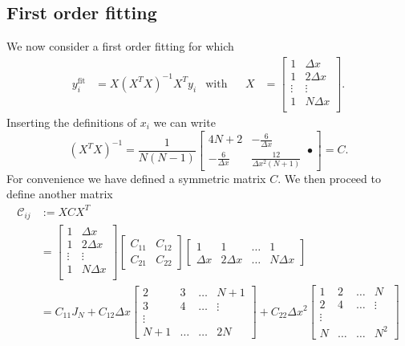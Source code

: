 \subsection{First order fitting}
We now consider a first order fitting for which
\begin{align}
y^{\textrm{fit}}_{i} & = X\left(X^{T}X\right)^{-1} X^{T} y_{i} & \textrm{with} &&
X & = \left[\begin{array}{cc}
1 & \Delta x \\
1 & 2 \Delta x  \\
\vdots & \vdots  \\
1 & N \Delta x  \\
\end{array}\right].
\end{align}
Inserting the definitions of $x_{i}$ we can write
\begin{equation}
\left(X^{T}X\right)^{-1} = \frac{1}{N(N-1)}\left[
\begin{array}{cc}
4N+2 & -\frac{6}{\Delta x} \\
 -\frac{6}{\Delta x} & \frac{12}{\Delta x^{2} (N+1)}
\end{array}•
\right] = C.
\end{equation}
For convenience we have defined a symmetric matrix $C$. We then proceed to
define another matrix
\begin{align}
    \mathcal{C}_{ij} & := XCX^{T} \\  & =
\left[\begin{array}{cc}
1 & \Delta x \\
1 & 2\Delta x  \\
\vdots & \vdots  \\
1 & N \Delta x \\
\end{array}\right]
\left[\begin{array}{cc} C_{11} & C_{12} \\ C_{21} & C_{22} \end{array}\right]
\left[\begin{array}{cccc}
1 & 1 & \dots & 1 \\
\Delta x & 2\Delta x & \dots  & N \Delta x
\end{array}\right] \\
& =
C_{11} J_{N} +
C_{12} \Delta x \left[ \begin{array}{cccc}
2 & 3 & \dots & N+1 \\ 3 & 4 & \dots & \vdots \\ \vdots & & & \\  N+1& \dots & \dots & 2N
\end{array}\right] +
C_{22} \Delta x^{2} \left[ \begin{array}{cccc}
1 & 2 & \dots & N \\ 2 & 4 & \dots & \vdots \\ \vdots & & & \\  N& \dots & \dots & N^{2}
\end{array}\right]
\end{align}
